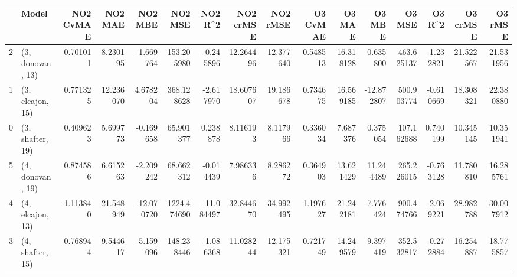 \begin{tabular}{llrrrrrrrrrrrrrr}
\toprule
{} &             Model &  NO2 CvMAE &    NO2 MAE &    NO2 MBE &      NO2 MSE &    NO2 R\textasciicircum2 &  NO2 crMSE &   NO2 rMSE &  O3 CvMAE &     O3 MAE &     O3 MBE &      O3 MSE &    O3 R\textasciicircum2 &   O3 crMSE &    O3 rMSE \\
\midrule
2 &  (3, donovan, 13) &   0.701011 &   8.230195 &  -1.669764 &   153.205980 &  -0.245896 &  12.264496 &  12.377640 &  0.548513 &  16.318128 &   0.635800 &  463.625137 & -1.232821 &  21.522567 &  21.531956 \\
1 &  (3, elcajon, 15) &   0.771325 &  12.236070 &   4.678204 &   368.128628 &  -2.617970 &  18.607607 &  19.186678 &  0.734675 &  16.569185 & -12.872807 &  500.903774 & -0.610669 &  18.308321 &  22.380880 \\
0 &  (3, shafter, 19) &   0.409623 &   5.699773 &  -0.169658 &    65.901377 &   0.238878 &   8.116193 &   8.117966 &  0.336034 &   7.687376 &   0.375054 &  107.162688 &  0.740199 &  10.345145 &  10.351941 \\
5 &  (4, donovan, 19) &   0.874586 &   6.615263 &  -2.209242 &    68.662312 &  -0.014439 &   7.986336 &   8.286272 &  0.364903 &  13.621429 &  11.244489 &  265.226015 & -0.763128 &  11.780810 &  16.285761 \\
4 &  (4, elcajon, 13) &   1.113840 &  21.548949 & -12.070720 &  1224.474690 & -11.084497 &  32.844670 &  34.992495 &  1.197627 &  21.242181 &  -7.776424 &  900.474766 & -2.069221 &  28.982788 &  30.007912 \\
3 &  (4, shafter, 15) &   0.768944 &   9.544617 &  -5.159096 &   148.238446 &  -1.086368 &  11.028244 &  12.175321 &  0.721749 &  14.249579 &   9.397419 &  352.532817 & -0.272884 &  16.254887 &  18.775857 \\
\bottomrule
\end{tabular}
